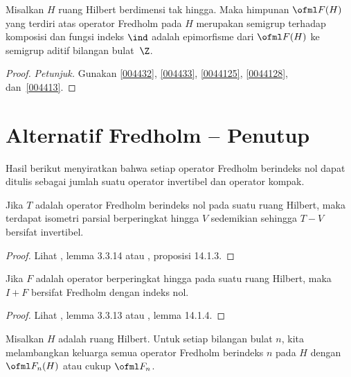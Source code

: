 \begin{prop} Misalkan $H$ ruang Hilbert berdimensi tak hingga. Maka himpunan $\ofml F(H)$ yang terdiri atas operator Fredholm
pada $H$ merupakan semigrup terhadap komposisi dan fungsi indeks $\ind$ adalah epimorfisme
dari $\ofml F(H)$ ke semigrup aditif bilangan bulat~$\Z$.
\end{prop}

\begin{proof} \emph{Petunjuk.} Gunakan \ref{004432}, \ref{004433}, \ref{0044125}, \ref{0044128},
dan~\ref{004413}. \ns
\end{proof}





















\section{Alternatif Fredholm -- Penutup}
Hasil berikut menyiratkan bahwa setiap operator Fredholm berindeks nol dapat ditulis sebagai
jumlah suatu operator invertibel dan operator kompak.

\begin{prop}\label{004712} Jika $T$ adalah operator Fredholm berindeks nol pada suatu ruang Hilbert,
maka terdapat isometri parsial berperingkat hingga $V$ sedemikian sehingga $T - V$ bersifat invertibel.
\end{prop}

\begin{proof} Lihat \cite{Pedersen:1995}, lemma 3.3.14 atau \cite{Wegge-Olsen:1993}, proposisi
14.1.3.  \ns
\end{proof}

\begin{lem} Jika $F$ adalah operator berperingkat hingga pada suatu ruang Hilbert, maka $I + F$ bersifat Fredholm dengan
indeks nol.
\end{lem}

\begin{proof} Lihat \cite{Pedersen:1995}, lemma 3.3.13 atau \cite{Wegge-Olsen:1993}, lemma 14.1.4. \ns
\end{proof}

\begin{notn} Misalkan $H$ adalah ruang Hilbert. Untuk setiap bilangan bulat $n$, kita melambangkan
keluarga semua operator Fredholm berindeks $n$ pada $H$ dengan $\ofml F_n(H)$ atau cukup $\ofml
F_n$.
\end{notn}

